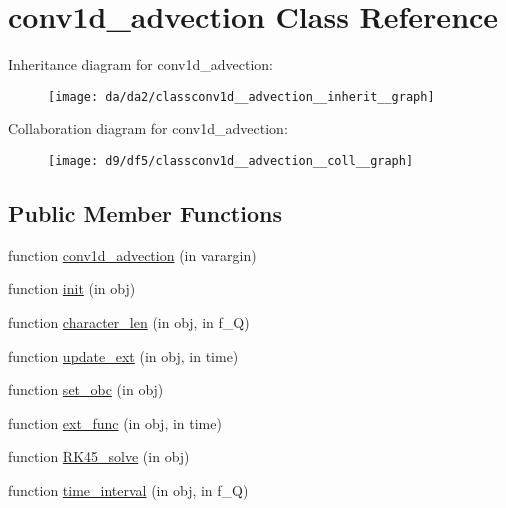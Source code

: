 \hypertarget{classconv1d__advection}{}\section{conv1d\+\_\+advection Class Reference}
\label{classconv1d__advection}


Inheritance diagram for conv1d\+\_\+advection\+:
\nopagebreak
\begin{figure}[H]
\begin{center}
\leavevmode
\texttt{[image: da/da2/classconv1d\_\_advection\_\_inherit\_\_graph]}
\end{center}
\end{figure}


Collaboration diagram for conv1d\+\_\+advection\+:
\nopagebreak
\begin{figure}[H]
\begin{center}
\leavevmode
\texttt{[image: d9/df5/classconv1d\_\_advection\_\_coll\_\_graph]}
\end{center}
\end{figure}
\subsection*{Public Member Functions}
\begin{DoxyCompactItemize}
\item 
function \hyperlink{classconv1d__advection_ac4456f6ccc1c883c1168eb8d84a81e3a}{conv1d\+\_\+advection} (in varargin)
\item 
function \hyperlink{classconv1d__advection_ae4bea3bfd914f26ee4b619209dead174}{init} (in obj)
\item 
function \hyperlink{classconv1d__advection_a9d3767628bcfe2980fc623cf1e07f046}{character\+\_\+len} (in obj, in f\+\_\+Q)
\item 
function \hyperlink{classconv1d__advection_a987300e67b9ad4668f30c530da31c5ae}{update\+\_\+ext} (in obj, in time)
\item 
function \hyperlink{classconv1d__advection_a4492aa9984b422bad92ddb977c0191bd}{set\+\_\+obc} (in obj)
\item 
function \hyperlink{classconv1d__advection_ab19c0cd2f986516631c572ef308397df}{ext\+\_\+func} (in obj, in time)
\item 
function \hyperlink{classconv1d__advection_ab2cc0337e4e4fc71b8f01e8bb91f1992}{R\+K45\+\_\+solve} (in obj)
\item 
function \hyperlink{classconv1d__advection_a814af8cdfcc32052e596866797fa7ba8}{time\+\_\+interval} (in obj, in f\+\_\+Q)
\end{DoxyCompactItemize}
